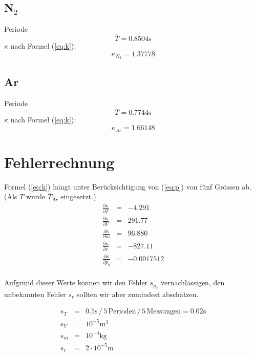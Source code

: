 \documentclass[12pt,a4paper]{article}
\begin{document}
\subsection*{N$_2$}
Periode
\[ \overline{T} = 0.8504\mbox{s} \]
$\kappa$ nach Formel (\ref{eq:k}):
\[ \kappa_{N_2} = 1.37778 \]

\subsection*{Ar}
Periode
\[ \overline{T} = 0.7744\mbox{s} \]
$\kappa$ nach Formel (\ref{eq:k}):
\[ \kappa_{Ar} = 1.66148 \]

\newpage
\section*{Fehlerrechnung}
Formel (\ref{eq:k}) h\"angt unter Ber\"ucksichtigung von (\ref{eq:p}) von f\"unf Gr\"ossen ab. (Als $T$ wurde $\overline{T}_{Ar}$ eingesetzt.)
\begin{eqnarray*}
\frac{\partial \kappa}{\partial T} & = & -4.291\\
\frac{\partial \kappa}{\partial V} & = & 291.77\\
\frac{\partial \kappa}{\partial m} & = & 96.880\\
\frac{\partial \kappa}{\partial r} & = & -827.11\\
\frac{\partial \kappa}{\partial p_a} & = & -0.0017512\\
\end{eqnarray*}

\noindent
Aufgrund dieser Werte k\"onnen wir den Fehler $s_{p_a}$ vernachl\"assigen, den unbekannten Fehler $s_r$ sollten wir aber zumindest absch\"atzen.

\begin{eqnarray*}
s_T & = & 0.5 \mbox{s}\hspace{2pt}/\hspace{2pt}5\hspace{2pt}\mbox{Perioden}\hspace{2pt}/\hspace{2pt}5\hspace{2pt}\mbox{Messungen} = 0.02 \mbox{s}\\
s_V & = & 10^{-5} \mbox{m}^3\\
s_m & = & 10^{-4} \mbox{kg}\\
s_r & = & 2\cdot 10^{-5} \mbox{m}\\
\end{eqnarray*}
\end{document}
